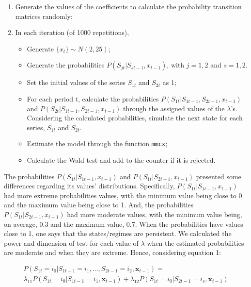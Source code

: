 \begin{enumerate}
\def\labelenumi{\arabic{enumi}.}
\tightlist
\item
  Generate the values of the coefficients to calculate the probability transition matrices randomly;
\item
  In each iteration (of 1000 repetitions),

  \begin{itemize}
  \tightlist
  \item
    Generate \(\{x_t\} \sim N(2,25)\);
  \item
    Generate the probabilities \(P \left(S_{jt}|S_{st-1}, x_{t-1} \right)\), with \(j=1,2\) and \(s=1,2\).
  \item
    Set the initial values of the series \(S_{1t}\) and \(S_{2t}\) as 1;
  \item
    For each period \(t\), calculate the probabilities \(P \left(S_{1t}|S_{1t-1}, S_{2t-1}, x_{t-1} \right)\) and \(P \left( S_{2t}|S_{1t-1}, S_{2t-1}, x_{t-1} \right)\) through the assigned values of the \(\lambda\)'s. Considering the calculated probabilities, simulate the next state for each series, \(S_{1t}\) and \(S_{2t}\).
  \item
    Estimate the model through the function \texttt{mmcx};
  \item
    Calculate the Wald test and add to the counter if it is rejected.
  \end{itemize}
\end{enumerate}

The probabilities \(P\left(S_{1t}|S_{1t-1}, x_{t-1} \right)\) and \(P\left(S_{1t}|S_{2t-1}, x_{t-1}\right)\) presented some differences regarding its values' distributions. Specifically, \(P\left(S_{1t}|S_{1t-1}, x_{t-1} \right)\) had more extreme probabilities values, with the minimum value being close to 0 and the maximum value being close to 1. And, the probabilities \(P\left(S_{1t}|S_{2t-1}, x_{t-1} \right)\) had more moderate values, with the minimum value being, on average, 0.3 and the maximum value, 0.7. When the probabilities have values close to 1, one says that the states/regimes are persistent. We calculated the power and dimension of test for each value of \(\lambda\) when the estimated probabilities are moderate and when they are extreme. Hence, considering equation 1:

\begin{multline}
P\left(S_{1t} =  i_0 | S_{1t-1} = i_1,\dots, S_{2t-1} = i_2, \boldsymbol{x}_{t-1} \right) = \\
\lambda_{11}P\left(S_{1t} =  i_0 | S_{1t-1} = i_1,\boldsymbol{x}_{t-1}\right) +  \lambda_{12}P\left(S_{1t} =  i_0 | S_{2t-1} = i_s, \boldsymbol{x}_{t-1} \right) \label{eq:eq12}
\end{multline}


